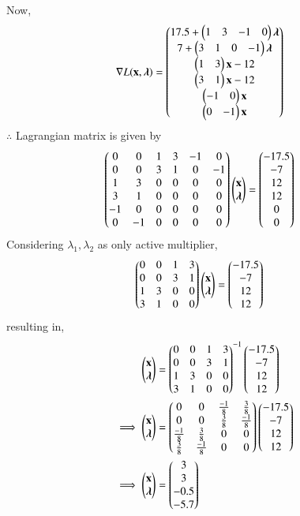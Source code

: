 \documentclass[journal,12pt,twocolumn]{IEEEtran}
\begin{document}
Now,
\begin{align}
\nabla L(\mathbf{x},\boldsymbol{\lambda}) &= \begin{pmatrix}17.5+ \begin{pmatrix}1 & 3  & -1 & 0 \end{pmatrix}\boldsymbol{\lambda}\\ 7+\begin{pmatrix}3 & 1 & 0 & -1\end{pmatrix}\boldsymbol{\lambda} \\ \begin{pmatrix}1 & 3\end{pmatrix}\mathbf{x}-12 \\ \begin{pmatrix}3 & 1\end{pmatrix}\mathbf{x}-12 \\  \begin{pmatrix}-1 & 0\end{pmatrix}\mathbf{x} \\ \begin{pmatrix}0 & -1\end{pmatrix}\mathbf{x}\end{pmatrix}
\end{align}
$\therefore$ Lagrangian matrix is given by
\begin{align}
\begin{pmatrix}0 & 0 & 1 & 3 & -1 & 0 \\ 0 & 0 & 3 & 1  & 0 & -1 \\ 1 & 3 & 0 & 0 & 0 & 0 \\ 3 & 1 & 0 & 0 & 0 & 0  \\ -1 & 0 & 0 & 0 & 0 & 0  \\ 0 & -1 & 0 & 0 & 0 & 0 \end{pmatrix}\begin{pmatrix}\mathbf{x} \\ \boldsymbol{\lambda} \end{pmatrix} &= \begin{pmatrix}-17.5 \\ -7 \\ 12 \\ 12 \\ 0 \\0 \end{pmatrix}
\end{align}
Considering $\lambda_1,\lambda_2$ as only active multiplier,
\begin{align}
\begin{pmatrix}0 & 0 & 1 & 3 \\ 0 & 0 & 3 & 1 \\ 1 & 3 & 0 & 0 \\ 3 & 1 & 0 & 0\end{pmatrix}\begin{pmatrix}\mathbf{x}\\ \boldsymbol{\lambda}\end{pmatrix} &= \begin{pmatrix}-17.5 \\ -7 \\ 12 \\ 12\end{pmatrix}
\end{align}
resulting in,
\begin{align}
\begin{pmatrix}\mathbf{x} \\ \boldsymbol{\lambda}\end{pmatrix} &= \begin{pmatrix}0 & 0 & 1 & 3 \\ 0 & 0 & 3 & 1 \\ 1 & 3 & 0 & 0 \\ 3 & 1 & 0 & 0\end{pmatrix}^{-1}\begin{pmatrix}-17.5 \\ -7 \\ 12 \\ 12\end{pmatrix}
\\
\implies   \begin{pmatrix}\mathbf{x} \\ \boldsymbol{\lambda}\end{pmatrix} &= \begin{pmatrix}0 & 0 & \frac{-1}{8} & \frac{3}{8} \\ 0 & 0 & \frac{3}{8} & \frac{-1}{8} \\ \frac{-1}{8} & \frac{3}{8} & 0 & 0 \\ \frac{3}{8} & \frac{-1}{8} & 0 & 0\end{pmatrix}\begin{pmatrix}-17.5 \\ -7 \\ 12 \\ 12\end{pmatrix}
\\
\implies \begin{pmatrix}\mathbf{x} \\ \boldsymbol{\lambda}\end{pmatrix} &= \begin{pmatrix}3 \\ 3 \\ -0.5 \\ -5.7 \end{pmatrix}
\end{align}
\end{document}
